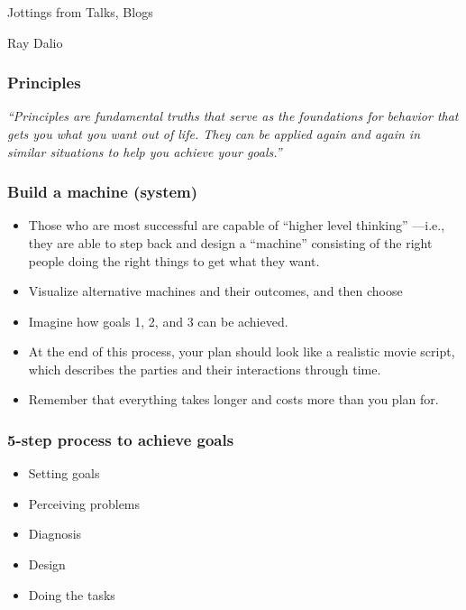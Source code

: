 \begin{frame}[fragile]\frametitle{}
\begin{center}
{\Large Jottings from Talks, Blogs}

{\small Ray Dalio}


\end{center}
\end{frame}


\begin{frame}[fragile]\frametitle{Principles}

{\em “Principles are fundamental truths that serve as the foundations for behavior that gets you what you want out of life. They can be applied again and again in similar situations to help you achieve your goals.” }

\end{frame}

\begin{frame}[fragile]\frametitle{Build a machine (system)}

\begin{itemize}
\item Those who are most successful are capable of “higher level thinking” —i.e., they are able to step back and design a “machine” consisting of the right people doing the right things to get what they want. 
\item Visualize alternative machines and their outcomes, and then choose
\item Imagine how goals 1, 2, and 3 can be achieved. 
\item At the end of this process, your plan should look like a realistic movie script, which describes the parties and their interactions through time. 
\item Remember that everything takes longer and costs more than you plan for. 
\end{itemize}

\end{frame}

\begin{frame}[fragile]\frametitle{5-step process to achieve goals}

\begin{itemize}
\item Setting goals
\item Perceiving problems
\item Diagnosis
\item Design
\item Doing the tasks
\end{itemize}

\end{frame}


